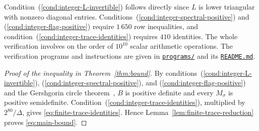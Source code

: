 Condition~(\ref{cond:integer-L-invertible}) follows directly since $L$
is lower triangular with nonzero diagonal entries.
Conditions~(\ref{cond:integer-spectral-positive}) and
(\ref{cond:integer-flag-positive}) require $1\,650$ row inequalities,
and condition~(\ref{cond:integer-trace-identities}) requires $410$
identities. The whole verification involves on the order of $10^{10}$
scalar arithmetic operations.
The verification programs and instructions are given in
\href{https://github.com/Diudiutse/triangle-free-signless-laplacian/tree/main/programs}{\texttt{programs/}}
and its
\href{https://github.com/Diudiutse/triangle-free-signless-laplacian/blob/main/programs/README.md}{\texttt{README.md}}.

\begin{proof}[Proof of the inequality in Theorem~\ref{thm:bound}]
By conditions~(\ref{cond:integer-L-invertible}),
(\ref{cond:integer-spectral-positive}), and
(\ref{cond:integer-flag-positive}) and the Gershgorin circle
theorem~\cite{Varga}, $B$ is positive definite and every $M_\sigma$
is positive semidefinite.
Condition~(\ref{cond:integer-trace-identities}), multiplied by
$2^{80}/\Delta$, gives \eqref{eq:finite-trace-identities}.
Hence Lemma~\ref{lem:finite-trace-reduction} proves
\eqref{eq:main-bound}.
\end{proof}

